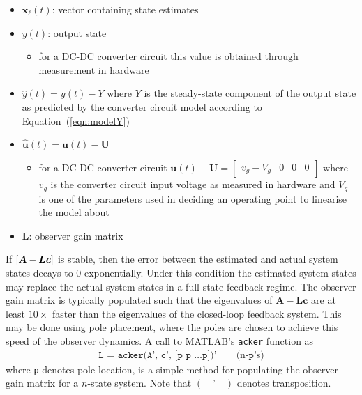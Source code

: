 \begin{itemize}
    \item $\boldsymbol{x}_\ell(t)$: vector containing state estimates
    \item $y(t)$: output state
    \begin{itemize}
        \item for a DC-DC converter circuit this value is obtained through measurement in hardware
    \end{itemize}
    \item $\hat{y}(t) = y(t) - Y$ where $Y$ is the steady-state component of the output state as predicted by the converter circuit model according to Equation~(\ref{eqn:modelY})
    \item $\hat{\boldsymbol{u}}(t) = \boldsymbol{u}(t) - \boldsymbol{U}$
    \begin{itemize}
        \item for a DC-DC converter circuit $\boldsymbol{u}(t) - \boldsymbol{U} = \begin{bmatrix}v_g - V_g & 0 & 0 & 0\end{bmatrix}$ where $v_g$ is the converter circuit input voltage as measured in hardware and $V_g$ is one of the parameters used in deciding an operating point to linearise the model about
    \end{itemize}
    \item $\boldsymbol{L}$: observer gain matrix
\end{itemize}
If $\left[\boldsymbol{A} - \boldsymbol{L}\boldsymbol{c}\right]$ is stable, then the error between the estimated and actual system states decays to 0 exponentially. Under this condition the estimated system states may replace the actual system states in a full-state feedback regime.
\newpar
The observer gain matrix is typically populated such that the eigenvalues of $\boldsymbol{A} - \boldsymbol{L}\boldsymbol{c}$ are at least $10 \times$ faster than the eigenvalues of the closed-loop feedback system. This may be done using pole placement, where the poles are chosen to achieve this speed of the observer dynamics. A call to \textsf{MATLAB}'s \texttt{acker} function as
\begin{align}
\texttt{L = acker(A', c', [p p \ldots p])'} \qquad \text{(n-}\texttt{p}\text{'s)}
\label{matlab:place}
\end{align}
where \texttt{p} denotes pole location, is a simple method for populating the observer gain matrix for a $n$-state system. Note that $(\quad\texttt{'}\quad)$ denotes transposition.
